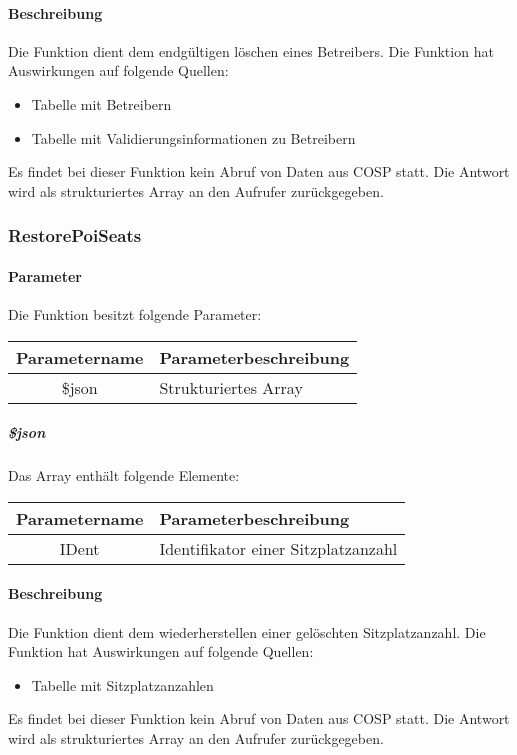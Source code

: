 \paragraph{Beschreibung} Die Funktion dient dem endgültigen löschen eines Betreibers. Die Funktion hat Auswirkungen auf folgende Quellen:
\begin{itemize}
	\item Tabelle mit Betreibern
	\item Tabelle mit Validierungsinformationen zu Betreibern
\end{itemize}
Es findet bei dieser Funktion kein Abruf von Daten aus {\glqq COSP\grqq} statt. Die Antwort wird als strukturiertes Array an den Aufrufer zurückgegeben.
\subsubsection{RestorePoiSeats}
\paragraph{Parameter} Die Funktion besitzt folgende Parameter:
\begin{table}[H]
	\begin{tabular}{|c|p{11cm}|}
		\hline
		\textbf{Parametername} & \textbf{Parameterbeschreibung} \\ \hline
		\$json & Strukturiertes Array \\ \hline
	\end{tabular}
\end{table}
\subparagraph{\$json}Das Array enthält folgende Elemente:
\begin{table}[H]
	\begin{tabular}{|c|p{11cm}|}
		\hline
		\textbf{Parametername} & \textbf{Parameterbeschreibung} \\ \hline
		IDent & Identifikator einer Sitzplatzanzahl \\ \hline
	\end{tabular}
\end{table}
\paragraph{Beschreibung} Die Funktion dient dem wiederherstellen einer gelöschten Sitzplatzanzahl. Die Funktion hat Auswirkungen auf folgende Quellen:
\begin{itemize}
	\item Tabelle mit Sitzplatzanzahlen
\end{itemize}
Es findet bei dieser Funktion kein Abruf von Daten aus {\glqq COSP\grqq} statt. Die Antwort wird als strukturiertes Array an den Aufrufer zurückgegeben.
